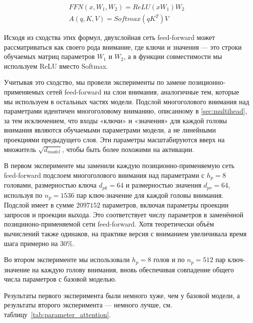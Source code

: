 \documentclass{article}
\begin{document}
\begin{align*}
    FFN(x, W_1, W_2) = ReLU(xW_1)W_2 \\
    A(q, K, V) = Softmax(qK^T)V
\end{align*}

Исходя из сходства этих формул, двухслойная сеть feed-forward может рассматриваться как своего рода внимание, где ключи и значения — это строки обучаемых матриц параметров $W_1$ и $W_2$, а в функции совместимости мы используем ReLU вместо Softmax.


Учитывая это сходство, мы провели эксперименты по замене позиционно-применяемых сетей feed-forward на слои внимания, аналогичные тем, которые мы используем в остальных частях модели. Подслой многоголового внимания над параметрами идентичен многоголовому вниманию, описанному в \ref{sec:multihead}, за тем исключением, что входы «ключи» и «значения» для каждой головы внимания являются обучаемыми параметрами модели, а не линейными проекциями предыдущего слоя. Эти параметры масштабируются вверх на множитель $\sqrt{d_{model}}$, чтобы быть более похожими на активации.

В первом эксперименте мы заменили каждую позиционно-применяемую сеть feed-forward подслоем многоголового внимания над параметрами с $h_p=8$ головами, размерностью ключа $d_{pk}=64$ и размерностью значения $d_{pv}=64$, используя по $n_p=1536$ пар ключ-значение для каждой головы внимания. Подслой имеет в сумме $2097152$ параметров, включая параметры проекции запросов и проекции выхода. Это соответствует числу параметров в заменённой позициионо-применяемой сети feed-forward. Хотя теоретически объём вычислений также одинаков, на практике версия с вниманием увеличивала время шага примерно на 30\%.

Во втором эксперименте мы использовали $h_p=8$ голов и по $n_p=512$ пар ключ-значение на каждую голову внимания, вновь обеспечивая совпадение общего числа параметров с базовой моделью.

Результаты первого эксперимента были немного хуже, чем у базовой модели, а результаты второго эксперимента — немного лучше, см. таблицу~\ref{tab:parameter_attention}.
\end{document}

